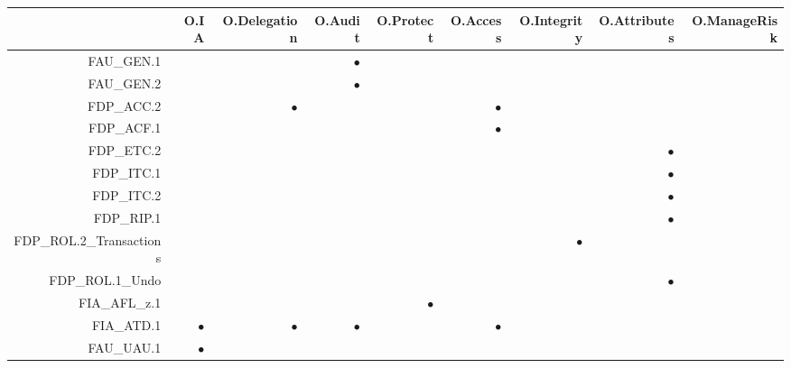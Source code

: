 \documentclass[12pt,english]{scrbook}
\newcommand{\oh}{$\bullet$}
\begin{document}
\begin{table}
    \scriptsize
    \begin{tabular}{rRRRRRRRR}
        \toprule
                            & O.IA & O.Delegation & O.Audit & O.Protect & O.Access & O.Integrity & O.Attributes & O.ManageRisk \\
        \midrule

FAU\_GEN.1                  &      &              & \oh     &           &          &             &              &              \\
FAU\_GEN.2                  &      &              & \oh     &           &          &             &              &              \\
FDP\_ACC.2                  &      & \oh          &         &           & \oh      &             &              &              \\
FDP\_ACF.1                  &      &              &         &           &  \oh     &             &              &              \\
FDP\_ETC.2                  &      &              &         &           &          &             &  \oh         &              \\                
FDP\_ITC.1                  &      &              &         &           &          &             &  \oh         &              \\
FDP\_ITC.2                  &      &              &         &           &          &             &     \oh      &              \\
FDP\_RIP.1                  &      &              &         &           &          &             &      \oh     &              \\
FDP\_ROL.2\_Transactions    &      &              &         &           &          &   \oh       &              &              \\
FDP\_ROL.1\_Undo            &      &              &         &           &          &             &  \oh         &              \\
FIA\_AFL\_z.1               &      &              &         &   \oh     &          &             &              &              \\
FIA\_ATD.1                  & \oh  &  \oh         &   \oh   &           & \oh      &             &              &              \\
FAU\_UAU.1                  & \oh  &              &         &           &          &             &              &              \\

\end{tabular}
\end{table}
\end{document}
